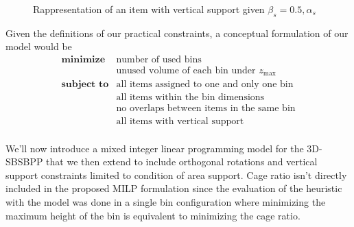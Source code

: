 \begin{figure}[H]
    \scalebox{0.55}{%
    
    }
    \caption{Rappresentation of an item with vertical support given $\beta_s = 0.5, \alpha_s$}
    \label{fig:support}
\end{figure}

\newpage
Given the definitions of our practical constraints, a conceptual formulation of our model would be
\begin{eqnarray*}
    \textbf{minimize} & \text{number of used bins} \\
                        & \text{unused volume of each bin under $z_\text{max}$} \\
    \textbf{subject to} & \text{all items assigned to one and only one bin} \\
                                      & \text{all items within the bin dimensions} \\
                                      & \text{no overlaps between items in the same bin} \\
                                      & \text{all items with vertical support} \\
\end{eqnarray*}

We'll now introduce a mixed integer linear programming model for the 3D-SBSBPP that we then extend to include orthogonal rotations and vertical support constraints limited to condition of area support.
Cage ratio isn't directly included in the proposed MILP formulation since the evaluation of the heuristic with the model was done in a single bin configuration where minimizing the maximum height of the bin is equivalent to minimizing the cage ratio.

